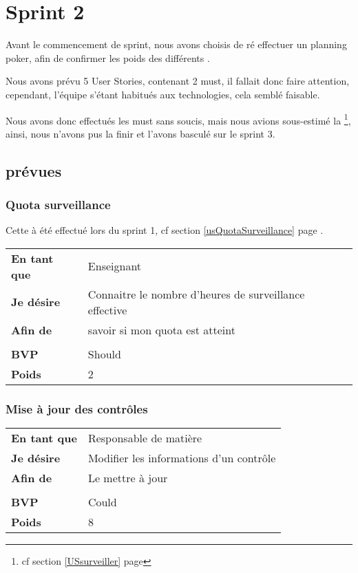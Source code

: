 \chapter{Sprint 2}
Avant le commencement de sprint, nous avons choisis de ré effectuer un planning poker,
afin de confirmer les poids des différents \USs{}.

Nous avons prévu 5 User Stories, contenant 2 must, il fallait donc faire attention, 
cependant, l'équipe s'étant habitués aux technologies, cela semblé faisable. 

Nous avons donc effectués les must sans soucis, mais nous avions sous-estimé la 
\footnote{cf section \ref{USsurveiller} page \pageref{USsurveiller}}, 
ainsi, nous n'avons pus la finir et l'avons basculé sur le sprint 3.

\section{\USs{} prévues}
\subsection{Quota surveillance}		
Cette \US{} à été effectué lors du sprint 1, cf section \ref{usQuotaSurveillance} page
\pageref{usQuotaSurveillance}.

\begin{tabular}{ll}
	\textbf{En tant que}	&	Enseignant \\
	\textbf{Je désire}&	Connaitre le nombre d'heures de surveillance effective\\
	\textbf{Afin de}	&	savoir si mon quota est atteint\\
	&\\
	\textbf{BVP} & Should\\
	\textbf{Poids} & 2\\
\end{tabular}
\subsection{Mise à jour des contrôles}		
\begin{tabular}{ll}
	\textbf{En tant que}	&	Responsable de matière\\
	\textbf{Je désire}& Modifier les informations d'un contrôle\\	
	\textbf{Afin de}	& Le mettre à jour\\	
	&\\
	\textbf{BVP} & Could\\
	\textbf{Poids} & 8\\
\end{tabular}
